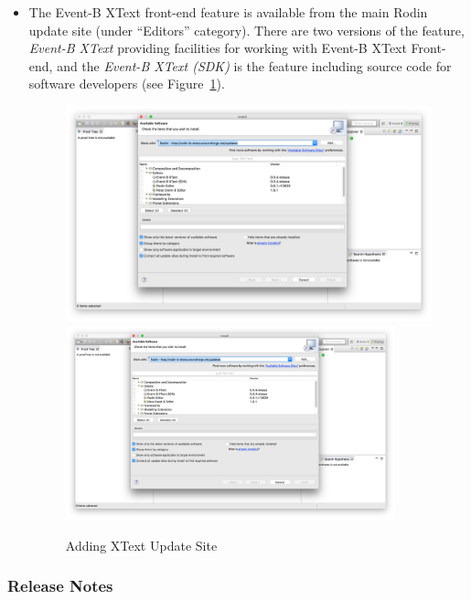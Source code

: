 \begin{itemize}
\item The Event-B XText front-end feature is available from the main Rodin update site (under ``Editors'' category). There are two versions of the feature, \emph{Event-B XText} providing facilities for working with Event-B XText Front-end, and the \emph{Event-B XText (SDK)} is the feature including source code for software developers (see Figure~\ref{fig:EventBXText-installation}).
\begin{figure}[!htbp]
  \centering
  \ifplastex
  \includegraphics[width=512]{figures/EventBXTextInstallation}
  \else
  \includegraphics[width=0.9\textwidth]{figures/EventBXTextInstallation}
  \fi
  \caption{Adding XText Update Site}
  \label{fig:EventBXText-installation}
\end{figure}

\end{itemize}

\subsubsection{Release Notes}
\label{sec:release-notes}


